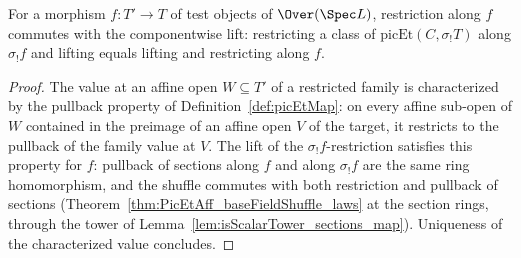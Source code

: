 \begin{theorem}
  \label{thm:picEtMap_picEtCrossBase}
  \leanok
  For a morphism \(f \colon T' \to T\) of test objects of \(\Over(\Spec L)\),
  restriction along \(f\) commutes with the componentwise lift:
  restricting a class of \(\mathrm{picEt}(C, \sigma_{!}T)\) along
  \(\sigma_{!}f\) and lifting equals lifting and restricting along \(f\).
\end{theorem}
\begin{proof}
  \leanok
  The value at an affine open \(W \subseteq T'\) of a restricted family is
  characterized by the pullback property of Definition~\ref{def:picEtMap}: on every
  affine sub-open of \(W\) contained in the preimage of an affine open \(V\) of the
  target, it restricts to the pullback of the family value at \(V\).  The lift of the
  \(\sigma_{!}f\)-restriction satisfies this property for \(f\): pullback of sections
  along \(f\) and along \(\sigma_{!}f\) are the same ring homomorphism, and the
  shuffle commutes with both restriction and pullback of sections
  (Theorem~\ref{thm:PicEtAff_baseFieldShuffle_laws} at the section rings, through the
  tower of Lemma~\ref{lem:isScalarTower_sections_map}).  Uniqueness of the
  characterized value concludes.
\end{proof}


